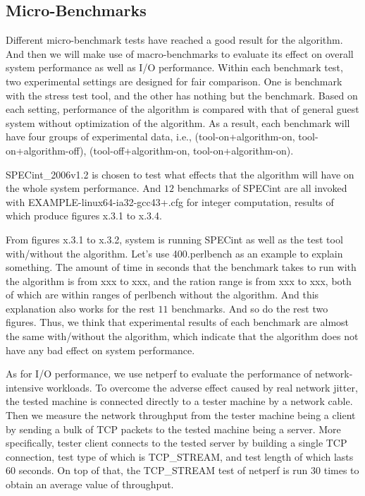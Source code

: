 \documentclass[letterpaper,twocolumn,10pt]{article}
\begin{document}
\subsection{Micro-Benchmarks}

Different micro-benchmark tests have reached a good result for the algorithm. And then we will make use of macro-benchmarks to evaluate its effect on overall system performance as well as I/O performance. Within each benchmark test, two experimental settings are designed for fair comparison. One is benchmark with the stress test tool, and the other has nothing but the benchmark. Based on each setting, performance of the algorithm is compared with that of general guest system without optimization of the algorithm. As a result, each benchmark will have four groups of experimental data, i.e., (tool-on+algorithm-on, tool-on+algorithm-off), (tool-off+algorithm-on, tool-on+algorithm-on).

SPECint\_2006v1.2 is chosen to test what effects that the algorithm will have on the whole system performance. And $12$ benchmarks of SPECint are all invoked with EXAMPLE-linux64-ia32-gcc43+.cfg for integer computation, results of which produce figures x.3.1 to x.3.4.

From figures x.3.1 to x.3.2, system is running SPECint as well as the test tool with/without the algorithm. Let’s use 400.perlbench as an example to explain something. The amount of time in seconds that the benchmark takes to run with the algorithm is from xxx to xxx, and the ration range is from xxx to xxx, both of which are within ranges of perlbench without the algorithm. And this explanation also works for the rest $11$ benchmarks. And so do the rest two figures. Thus, we think that experimental results of each benchmark are almost the same with/without the algorithm, which indicate that the algorithm does not have any bad effect on system performance.

As for I/O performance, we use netperf to evaluate the performance of network-intensive workloads. To overcome the adverse effect caused by real network jitter, the tested machine is connected directly to a tester machine by a network cable. Then we measure the network throughput from the tester machine being a client by sending a bulk of TCP packets to the tested machine being a server. More specifically, tester client connects to the tested server by building a single TCP connection, test type of which is TCP\_STREAM, and test length of which lasts $60$ seconds. On top of that, the TCP\_STREAM test of netperf is run $30$ times to obtain an average value of throughput.
\end{document}
